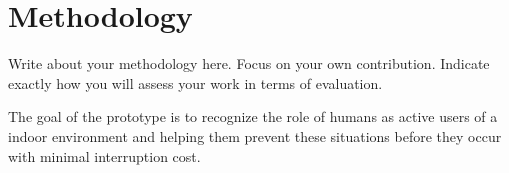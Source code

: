 \section{Methodology}
\label{sec:methodology}
Write about your methodology here. Focus on your own contribution. Indicate exactly how you will assess your work in terms of evaluation.

The goal of the prototype is to recognize the role of humans as active users of a indoor environment and helping them prevent these situations before they occur with minimal interruption cost.

